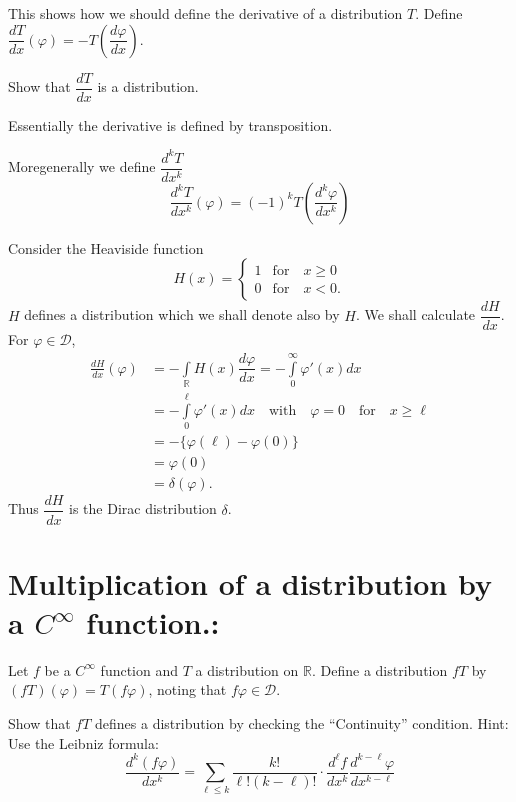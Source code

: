 This shows how we should define the derivative of a distribution $T$. Define $\dfrac{dT}{dx}(\varphi)=-T\left(\dfrac{d\varphi}{dx}\right)$.

\begin{exer*}
Show that $\dfrac{dT}{dx}$ is a distribution.
\end{exer*}

Essentially the derivative is defined by transposition.

More\pageoriginale generally we define $\dfrac{d^{k}T}{dx^{k}}$
$$
\dfrac{d^{k}T}{dx^{k}}(\varphi)=(-1)^{k}T\left(\dfrac{d^{k}\varphi}{dx^{k}}\right)
$$

\begin{example*}
Consider the Heaviside function
$$
H(x)=
\begin{cases}
1 & \text{for}\quad x\geq 0\\[3pt]
0 & \text{for}\quad x<0.
\end{cases}
$$
$H$ defines a distribution which we shall denote also by $H$. We shall calculate $\dfrac{dH}{dx}$. For $\varphi \in \mathcal{D}$,
\begin{align*}
\frac{dH}{dx}(\varphi) &= -\int\limits_{\mathbb{R}}H(x)\dfrac{d\varphi}{dx}=-\int\limits^{\infty}_{0}\varphi'(x)dx\\[4pt]
&= -\int\limits^{\ell}_{0}\varphi'(x)dx\quad\text{with}\quad \varphi=0\text{~~ for~~ } x\geq \ell\\[4pt]
&=-\{\varphi(\ell)-\varphi(0)\}\\[4pt]
&= \varphi(0)\\[4pt]
&= \delta (\varphi).
\end{align*}
Thus $\dfrac{dH}{dx}$ is the Dirac distribution $\delta$.
\end{example*}

\section*{Multiplication of a distribution by a $C^{\infty}$ function.:}

Let $f$ be a $C^{\infty}$ function and $T$ a distribution on $\mathbb{R}$. Define a distribution $fT$ by $(fT)(\varphi)=T(f\varphi)$, noting that $f\varphi \in \mathcal{D}$.

\begin{exer*}
Show that $fT$ defines a distribution by checking the ``Continuity'' condition. Hint: Use the Leibniz formula:
$$
\dfrac{d^{k}(f\varphi)}{dx^{k}}=\sum\limits_{\ell \leq k}\dfrac{k!}{\ell !(k-\ell)!}\cdot \dfrac{d^{\ell}f}{dx^{k}}\dfrac{d^{k-\ell}\varphi}{dx^{k-\ell}}
$$
\end{exer*}

